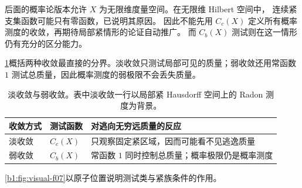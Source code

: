 \ProseParagraphBreak

后面的概率论版本允许 \(X\) 为无限维度量空间。在无限维 Hilbert 空间中，
连续紧支集函数可能只有零函数，已说明其原因。
因此不能先用 \(C_c(X)\) 定义所有概率测度的收敛，再期待局部紧情形的论证自动推广。
而 \(C_b(X)\) 测试则在这一情形仍有充分的区分能力。

\ProseParagraphBreak

\cref{b1:tab:vague-weak-measures}概括两种收敛最直接的分界。淡收敛只测试局部可见的质量；弱收敛还用常函数 \(1\) 测试总质量，因此概率测度的弱极限不会丢失质量。
\begin{table}[htbp]
  \centering
  \caption[淡收敛与弱收敛]{淡收敛与弱收敛。表中淡收敛一行以局部紧 Hausdorff 空间上的 Radon 测度为背景。}
  \label{b1:tab:vague-weak-measures}
  \begin{tabularx}{\textwidth}{@{}p{2.4cm}p{4.0cm}X@{}}
    \toprule
    收敛方式 & 测试函数 & 对逃向无穷远质量的反应 \\
    \midrule
    淡收敛 & \(C_c(X)\) & 只观察固定紧区域，因而可能看不见逃逸质量 \\
    弱收敛 & \(C_b(X)\) & 常函数 \(1\) 同时控制总质量；概率极限仍是概率测度 \\
    \bottomrule
  \end{tabularx}
\end{table}

\cref{b1:fig:visual-f07}以原子位置说明测试类与紧族条件的作用。

